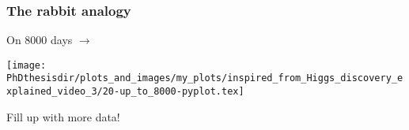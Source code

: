 \begin{frame}
\frametitle{The rabbit analogy}
\addtocounter{framenumber}{-1}
\transwipe[direction=90]
\begin{center}
\begin{minipage}[c]{.29\textwidth}
On \num{8000} days $\rightarrow$
\end{minipage}
\begin{minipage}[c]{.4\textwidth}
\vspace{-\baselineskip}
\texttt{[image: \\PhDthesisdir/plots\_and\_images/my\_plots/inspired\_from\_Higgs\_discovery\_explained\_video\_3/20-up\_to\_8000-pyplot.tex]}
\end{minipage}
\begin{minipage}[c]{.29\textwidth}
Fill up with more data!
\end{minipage}
\end{center}
\end{frame}




